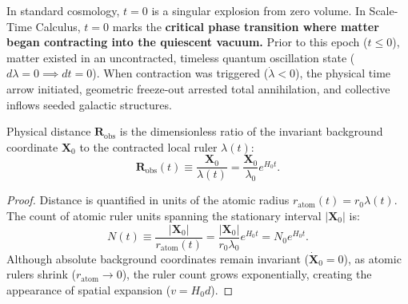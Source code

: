 \begin{corollary}[The $t = 0$ Epoch: Contraction Phase Transition Threshold]
    \label{cor:t_sifir_faz_esigi_main}
    In standard cosmology, $t = 0$ is a singular explosion from zero volume. In Scale-Time Calculus, $t = 0$ marks the \textbf{critical phase transition where matter began contracting into the quiescent vacuum.} Prior to this epoch ($t \le 0$), matter existed in an uncontracted, timeless quantum oscillation state ($d\lambda = 0 \implies dt = 0$). When contraction was triggered ($\dot{\lambda} < 0$), the physical time arrow initiated, geometric freeze-out arrested total annihilation, and collective inflows seeded galactic structures.
\end{corollary}

\begin{theorem}
    \label{thm:konum_uzaklik_turetilis_main}
    Physical distance $\mathbf{R}_{\mathrm{obs}}$ is the dimensionless ratio of the invariant background coordinate $\mathbf{X}_0$ to the contracted local ruler $\lambda(t)$:
    \begin{equation}
        \mathbf{R}_{\mathrm{obs}}(t) \equiv \frac{\mathbf{X}_0}{\lambda(t)} = \frac{\mathbf{X}_0}{\lambda_0} e^{H_0 t}.
        \label{eq:konum_turetilis_main}
    \end{equation}
\end{theorem}

\begin{proof}
    Distance is quantified in units of the atomic radius $r_{\mathrm{atom}}(t) = r_0 \lambda(t)$. The count of atomic ruler units spanning the stationary interval $|\mathbf{X}_0|$ is:
    \begin{equation}
        N(t) \equiv \frac{|\mathbf{X}_0|}{r_{\mathrm{atom}}(t)} = \frac{|\mathbf{X}_0|}{r_0 \lambda_0} e^{H_0 t} = N_0 e^{H_0 t}.
        \label{eq:cetvel_sayimi_ispat}
    \end{equation}
    Although absolute background coordinates remain invariant ($\dot{\mathbf{X}}_0 = 0$), as atomic rulers shrink ($r_{\mathrm{atom}} \to 0$), the ruler count grows exponentially, creating the appearance of spatial expansion ($v = H_0 d$).
\end{proof}

